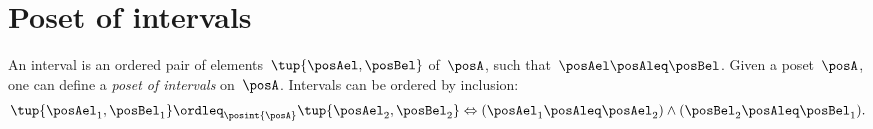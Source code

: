
\section{Poset of intervals}
\begin{definition}
  \label{def:poset_intervals}
  An interval is an ordered pair of elements~$\tup{\posAel,\posBel}$ of~$\posA$, such that~$\posAel \posAleq \posBel$. Given a poset~$\posA$, one can define a \emph{poset of intervals} on~$\posA$.
  Intervals can be ordered by inclusion:
  \begin{equation*}
    \tup{\posAel_1,\posBel_1}\ordleq_{\posint{\posA}}\tup{\posAel_2,\posBel_2} \Leftrightarrow (\posAel_1\posAleq \posAel_2)\wedge (\posBel_2\posAleq \posBel_1).
  \end{equation*}
\end{definition}